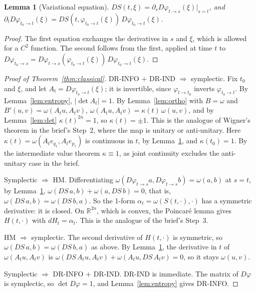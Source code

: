 \documentclass[11pt]{article}
\newtheorem{lemma}[theorem]{Lemma}
\theoremstyle{definition}
\theoremstyle{remark}
\begin{document}
\begin{lemma}[Variational equation]\label{lem:variational}
  $DS(t, \xi) = \partial_s D\varphi_{t\to s}(\xi)|_{s=t}$, and
  $\partial_t D\varphi_{t_0\to t}(\xi) = DS(t, \varphi_{t_0\to t}(\xi))\,D\varphi_{t_0\to t}(\xi)$.
\end{lemma}

\begin{proof}
  The first equation exchanges the derivatives in $s$ and $\xi$, which is allowed for a $C^2$
  function. The second follows from the first, applied at time $t$ to
  $D\varphi_{t_0\to s} = D\varphi_{t\to s}(\varphi_{t_0\to t}(\xi))\,D\varphi_{t_0\to t}(\xi)$.
\end{proof}

\begin{proof}[Proof of Theorem~\ref{thm:classical}]
  DR-INFO $+$ DR-IND $\Rightarrow$ symplectic. Fix $t_0$ and $\xi$, and let
  $A_t = D\varphi_{t_0\to t}(\xi)$; it is invertible, since $\varphi_{t\to t_0}$ inverts
  $\varphi_{t_0\to t}$. By Lemma~\ref{lem:entropy}, $|\det A_t| = 1$. By Lemma~\ref{lem:ortho}
  with $B = \omega$ and $B'(u, v) = \omega(A_t u, A_t v)$, $\omega(A_t u, A_t v) =
  \kappa(t)\,\omega(u, v)$, and by Lemma~\ref{lem:det} $\kappa(t)^{2n} = 1$, so $\kappa(t) = \pm1$.
  This is the analogue of Wigner's theorem in the brief's Step~2, where the map is unitary or
  anti-unitary. Here $\kappa(t) = \omega(A_t e_{q_1}, A_t e_{p_1})$ is continuous in $t$, by
  Lemma~\ref{lem:variational}, and $\kappa(t_0) = 1$. By the intermediate value theorem
  $\kappa \equiv 1$, as joint continuity excludes the anti-unitary case in the brief.

  Symplectic $\Rightarrow$ HM. Differentiating $\omega(D\varphi_{t\to s}a, D\varphi_{t\to s}b) =
  \omega(a, b)$ at $s = t$, by Lemma~\ref{lem:variational},
  $\omega(DS\,a, b) + \omega(a, DS\,b) = 0$, that is, $\omega(DS\,a, b) = \omega(DS\,b, a)$. So
  the 1-form $\alpha_t = \omega(S(t, \cdot), \cdot)$ has a symmetric derivative: it is closed.
  On $\mathbb R^{2n}$, which is convex, the Poincar\'e lemma gives $H(t, \cdot)$ with
  $dH_t = \alpha_t$. This is the analogue of the brief's Step~3.

  HM $\Rightarrow$ symplectic. The second derivative of $H(t, \cdot)$ is symmetric, so
  $\omega(DS\,a, b) = \omega(DS\,b, a)$ as above. By Lemma~\ref{lem:variational}, the derivative
  in $t$ of $\omega(A_t u, A_t v)$ is $\omega(DS\,A_tu, A_tv) + \omega(A_tu, DS\,A_tv) = 0$, so it
  stays $\omega(u, v)$.

  Symplectic $\Rightarrow$ DR-INFO $+$ DR-IND. DR-IND is immediate. The matrix of $D\varphi$ is
  symplectic, so $\det D\varphi = 1$, and Lemma~\ref{lem:entropy} gives DR-INFO.
\end{proof}
\end{document}
